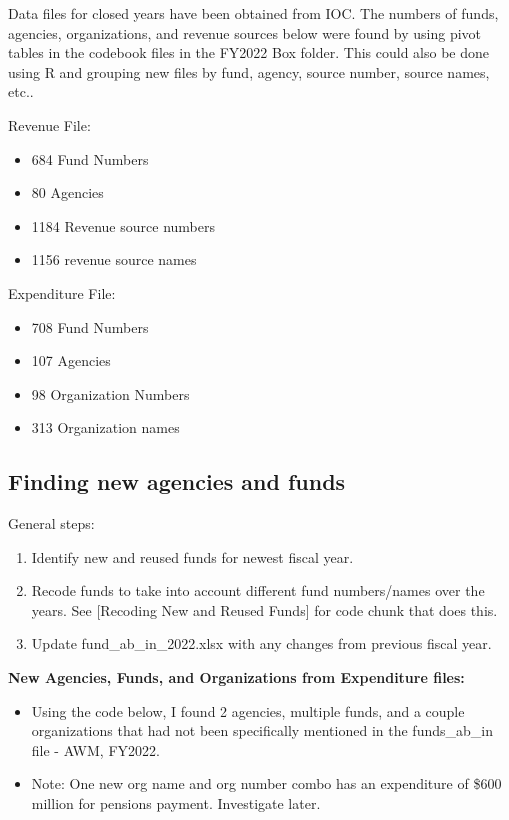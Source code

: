 \documentclass[
  letterpaper,
  DIV=11,
  numbers=noendperiod]{scrreport}
\providecommand{\tightlist}{%
  \setlength{\itemsep}{0pt}\setlength{\parskip}{0pt}}\usepackage{longtable,booktabs,array}
\begin{document}
Data files for closed years have been obtained from IOC. The numbers of
funds, agencies, organizations, and revenue sources below were found by
using pivot tables in the codebook files in the FY2022 Box folder. This
could also be done using R and grouping new files by fund, agency,
source number, source names, etc..

Revenue File:

\begin{itemize}
\tightlist
\item
  684 Fund Numbers
\item
  80 Agencies
\item
  1184 Revenue source numbers
\item
  1156 revenue source names
\end{itemize}

Expenditure File:

\begin{itemize}
\tightlist
\item
  708 Fund Numbers
\item
  107 Agencies
\item
  98 Organization Numbers
\item
  313 Organization names
\end{itemize}

\hypertarget{finding-new-agencies-and-funds}{%
\subsection{Finding new agencies and
funds}\label{finding-new-agencies-and-funds}}

General steps:

\begin{enumerate}
\def\labelenumi{\arabic{enumi}.}
\tightlist
\item
  Identify new and reused funds for newest fiscal year.
\item
  Recode funds to take into account different fund numbers/names over
  the years. See {[}Recoding New and Reused Funds{]} for code chunk that
  does this.
\item
  Update fund\_ab\_in\_2022.xlsx with any changes from previous fiscal
  year.
\end{enumerate}

\textbf{New Agencies, Funds, and Organizations from Expenditure files:}

\begin{itemize}
\tightlist
\item
  Using the code below, I found 2 agencies, multiple funds, and a couple
  organizations that had not been specifically mentioned in the
  funds\_ab\_in file - AWM, FY2022.
\item
  Note: One new org name and org number combo has an expenditure of
  \$600 million for pensions payment. Investigate later.
\end{itemize}
\end{document}
